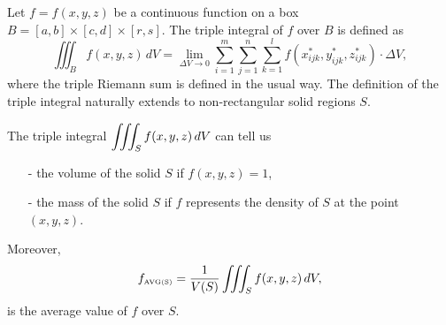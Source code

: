 \begin{summary}
\item Let $f = f(x,y,z)$ be a continuous function on a box $B = [a,b] \times [c,d] \times [r,s]$. 
 The triple integral of $f$ over $B$ is defined as
\[\iiint_B f(x,y,z) \, dV = \lim_{\Delta V \to 0} \sum_{i=1}^m \sum_{j=1}^n \sum_{k=1}^l f(x_{ijk}^*, y_{ijk}^*, z_{ijk}^*) \cdot \Delta V,\]
where the triple Riemann sum is defined in the usual way. %
The definition of the triple integral naturally extends to non-rectangular solid regions $S$.
\item The triple integral $\displaystyle \iiint_S f(x,y,z) \, dV$ can tell us
    \begin{itemize}
    \item[-] the volume of the solid $S$ if $f(x,y,z) = 1$,
    \item[-] the mass of the solid $S$ if $f$ represents the density of $S$ at the point $(x,y,z)$.
    \end{itemize}
Moreover,     \[f_{\mbox{\tiny{AVG}(S)}} = \displaystyle \frac{1}{V(S)} \iiint_S f(x,y,z) \, dV,\] is the average value of $f$ over $S$.
\end{summary}

\nin \hrulefill



\clearpage
